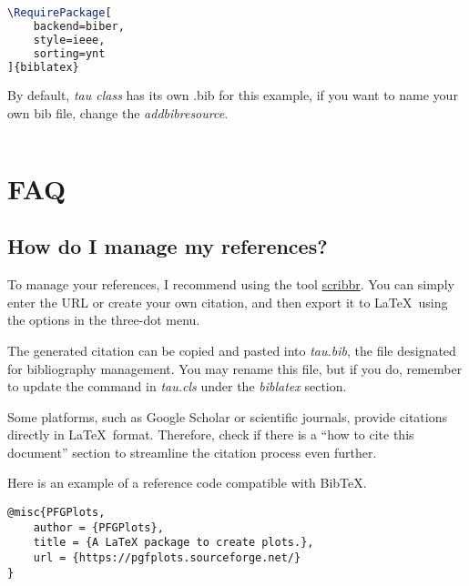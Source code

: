 \documentclass[9pt,a4paper,twocolumn,twoside]{tau-class/tau}
\begin{document}
\begin{lstlisting}[language=TeX, caption=References style.]
\RequirePackage[
	backend=biber,
	style=ieee,
	sorting=ynt
]{biblatex}
\end{lstlisting}

        By default, \textit{tau class} has its own .bib for this example, if you want to name your own bib file, change the \textit{addbibresource}.
		
\begin{lstlisting}[language=TeX]

\end{lstlisting}

\section{FAQ}

    \subsection*{How do I manage my references?}
        
        To manage your references, I recommend using the tool \href{https://www.scribbr.es/citar/generador/folders/73QOXYsCwMRu4ifQaN65mx/lists/msTfx7GJjIAOUkufbISnA/}{scribbr}. You can simply enter the URL or create your own citation, and then export it to \LaTeX\ using the options in the three-dot menu.
            
        The generated citation can be copied and pasted into \textit{tau.bib}, the file designated for bibliography management. You may rename this file, but if you do, remember to update the \verb|| command in \textit{tau.cls} under the \textit{biblatex} section.
    
        \begin{note}
            Some platforms, such as Google Scholar or scientific journals, provide citations directly in \LaTeX\ format. Therefore, check if there is a ``how to cite this document'' section to streamline the citation process even further.
        \end{note}
    
        Here is an example of a reference code compatible with Bib\TeX.

\begin{verbatim}
@misc{PFGPlots,
    author = {PFGPlots},
    title = {A LaTeX package to create plots.},
    url = {https://pgfplots.sourceforge.net/}
}
\end{verbatim}
\end{document}
